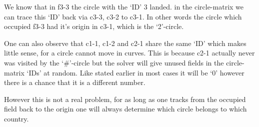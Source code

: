 We know that in f3-3 the circle with the `ID' 3 landed. in the circle-matrix we can trace this `ID' back via c3-3, c3-2 to c3-1. In other words the circle which occupied f3-3 had it's origin in c3-1, which is the `2'-circle.

One can also observe that c1-1, c1-2 and c2-1 share the same `ID' which makes little sense, for a circle cannot move in curves. This is because c2-1 actually never was visited by the `\#'-circle but the solver will give unused fields in the circle-matrix `IDs' at random. Like stated earlier in most cases it will be `0' however there is a chance that it is a different number.

However this is not a real problem, for as long as one tracks from the occupied field back to the origin one will always determine which circle belongs to which country.